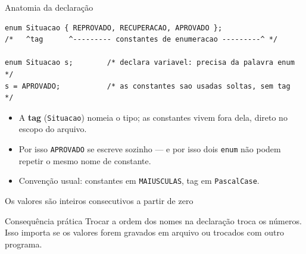 \documentclass[aspectratio=169]{beamer}
\begin{document}
\begin{frame}[fragile]{Anatomia da declaração}
\begin{lstlisting}[numbers=none, basicstyle=\ttfamily\small]
enum Situacao { REPROVADO, RECUPERACAO, APROVADO };
/*   ^tag      ^--------- constantes de enumeracao ---------^ */

enum Situacao s;        /* declara variavel: precisa da palavra enum */
s = APROVADO;           /* as constantes sao usadas soltas, sem tag  */
\end{lstlisting}
  \begin{itemize}
    \item A \textbf{tag} (\texttt{Situacao}) nomeia o tipo; as constantes vivem
      fora dela, direto no escopo do arquivo.
    \item Por isso \texttt{APROVADO} se escreve sozinho --- e por isso dois
      \texttt{enum} não podem repetir o mesmo nome de constante.
    \item Convenção usual: constantes em \texttt{MAIUSCULAS}, tag em
      \texttt{PascalCase}.
  \end{itemize}
\end{frame}

\begin{frame}{Os valores são inteiros consecutivos a partir de zero}
  \begin{center}
  \end{center}
  \begin{block}{Consequência prática}
    Trocar a ordem dos nomes na declaração troca os números. Isso importa se os
    valores forem gravados em arquivo ou trocados com outro programa.
  \end{block}
\end{frame}
\end{document}
